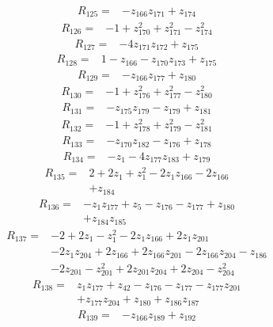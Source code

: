 \begin{align*}
R_{125}={}&-z_{166}z_{171}+z_{174}
\end{align*}
\begin{align*}
R_{126}={}&-1+z_{170}^{2}+z_{171}^{2}-z_{174}^{2}
\end{align*}
\begin{align*}
R_{127}={}&-4z_{171}z_{172}+z_{175}
\end{align*}
\begin{align*}
R_{128}={}&1-z_{166}-z_{170}z_{173}+z_{175}
\end{align*}
\begin{align*}
R_{129}={}&-z_{166}z_{177}+z_{180}
\end{align*}
\begin{align*}
R_{130}={}&-1+z_{176}^{2}+z_{177}^{2}-z_{180}^{2}
\end{align*}
\begin{align*}
R_{131}={}&-z_{175}z_{179}-z_{179}+z_{181}
\end{align*}
\begin{align*}
R_{132}={}&-1+z_{178}^{2}+z_{179}^{2}-z_{181}^{2}
\end{align*}
\begin{align*}
R_{133}={}&-z_{170}z_{182}-z_{176}+z_{178}
\end{align*}
\begin{align*}
R_{134}={}&-z_{1}-4z_{177}z_{183}+z_{179}
\end{align*}
\begin{align*}
R_{135}={}&2+2z_{1}+z_{1}^{2}-2z_{1}z_{166}-2z_{166}\\
&+z_{184}
\end{align*}
\begin{align*}
R_{136}={}&-z_{1}z_{177}+z_{5}-z_{176}-z_{177}+z_{180}\\
&+z_{184}z_{185}
\end{align*}
\begin{align*}
R_{137}={}&-2+2z_{1}-z_{1}^{2}-2z_{1}z_{166}+2z_{1}z_{201}\\
&-2z_{1}z_{204}+2z_{166}+2z_{166}z_{201}-2z_{166}z_{204}-z_{186}\\
&-2z_{201}-z_{201}^{2}+2z_{201}z_{204}+2z_{204}-z_{204}^{2}
\end{align*}
\begin{align*}
R_{138}={}&z_{1}z_{177}+z_{42}-z_{176}-z_{177}-z_{177}z_{201}\\
&+z_{177}z_{204}+z_{180}+z_{186}z_{187}
\end{align*}
\begin{align*}
R_{139}={}&-z_{166}z_{189}+z_{192}
\end{align*}
